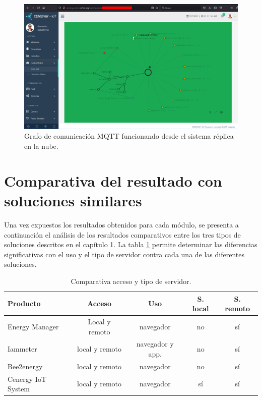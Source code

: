 \begin{landscape} %
\begin{figure}[htpb]
\centering 
\includegraphics[width=1.6\textwidth]{./Figures/test/replicador/remoto.png}
\caption{Grafo de comunicación MQTT funcionando desde el sistema réplica en la nube.}
\label{fig:graforemoto}
\end{figure}
\end{landscape} 

\section{Comparativa del resultado con soluciones similares}

Una vez expuestos los resultados obtenidos para cada módulo, se presenta a continuación el análisis de los resultados comparativos entre los tres tipos de soluciones descritos en el capítulo 1. La tabla \ref{tab:tabla-resultado} permite determinar las diferencias significativas con el uso y el tipo de servidor contra cada una de las diferentes soluciones.

\begin{table}[h]
	\centering
	\caption[Comparativa de soluciones entre acceso y servidor]{Comparativa acceso y tipo de servidor.}
	\begin{tabular}{l c c c c }    
		\toprule
		\textbf{Producto} & \textbf{Acceso}  & \textbf{Uso} & \textbf{S. local}   & \textbf{S. remoto} \\
		\midrule
		Energy Manager & Local y remoto 	& navegador & no & sí  \\		
		Iammeter	 & local y remoto	& navegador y app. & no & sí  \\
		Bee2energy	 & local y remoto	& navegador & no & sí  \\
		\rowcolor[HTML]{ebedef}Cenergy IoT System & local y remoto& navegador & sí & sí \\
		\bottomrule
		\hline
	\end{tabular}
	\label{tab:tabla-resultado}
\end{table}

